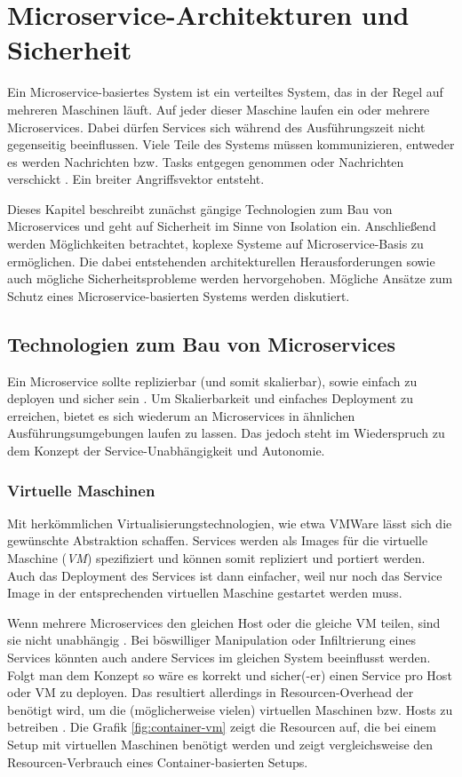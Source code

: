 \section{Microservice-Architekturen und Sicherheit}

Ein Microservice-basiertes System ist ein verteiltes System, das in der Regel auf mehreren Maschinen läuft. Auf jeder dieser Maschine laufen ein oder mehrere Microservices. Dabei dürfen Services sich während des Ausführungszeit nicht gegenseitig beeinflussen. Viele Teile des Systems müssen kommunizieren, entweder es werden Nachrichten bzw. Tasks entgegen genommen oder Nachrichten verschickt \cite{newman2015}. Ein breiter Angriffsvektor entsteht.

Dieses Kapitel beschreibt zunächst gängige Technologien zum Bau von Microservices und geht auf Sicherheit im Sinne von Isolation ein. Anschließend werden Möglichkeiten betrachtet, koplexe Systeme auf Microservice-Basis zu ermöglichen. Die dabei entstehenden architekturellen Herausforderungen sowie auch mögliche Sicherheitsprobleme werden hervorgehoben. Mögliche Ansätze zum Schutz eines Microservice-basierten Systems werden diskutiert.


\subsection{Technologien zum Bau von Microservices}

Ein Microservice sollte replizierbar (und somit skalierbar), sowie einfach zu deployen und sicher sein \cite{newman2015,microservicesIO}. Um Skalierbarkeit und einfaches Deployment zu erreichen, bietet es sich wiederum an Microservices in ähnlichen Ausführungsumgebungen laufen zu lassen. Das jedoch steht im Wiederspruch zu dem Konzept der Service-Unabhängigkeit und Autonomie. 

\subsubsection{Virtuelle Maschinen}
Mit herkömmlichen Virtualisierungstechnologien, wie etwa VMWare lässt sich die gewünschte Abstraktion schaffen. Services werden als Images für die virtuelle Maschine (\textit{VM}) spezifiziert und können somit repliziert und portiert werden. Auch das Deployment des Services ist dann einfacher, weil nur noch das Service Image in der entsprechenden virtuellen Maschine gestartet werden muss.

Wenn mehrere Microservices den gleichen Host oder die gleiche VM teilen, sind sie nicht unabhängig \cite{microservicesIO}. Bei böswilliger Manipulation oder Infiltrierung eines Services könnten auch andere Services im gleichen System beeinflusst werden. Folgt man dem Konzept so wäre es korrekt und sicher(-er) einen Service pro Host oder VM zu deployen. Das resultiert allerdings in Resourcen-Overhead der benötigt wird, um die (möglicherweise vielen) virtuellen Maschinen bzw. Hosts zu betreiben \cite{newman2015}. Die Grafik \ref{fig:container-vm} zeigt die Resourcen auf, die bei einem Setup mit virtuellen Maschinen benötigt werden und zeigt vergleichsweise den Resourcen-Verbrauch eines Container-basierten Setups.

